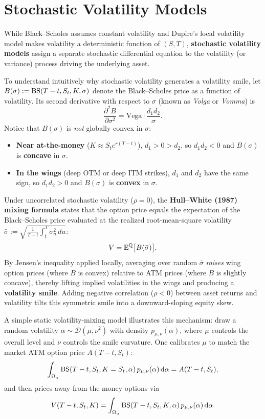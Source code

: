\section{Stochastic Volatility Models}
\label{sec:ch05-stoch-vol}

While Black--Scholes assumes constant volatility and Dupire's local volatility model makes volatility a deterministic function of $(S, T)$, \textbf{stochastic volatility models} assign a separate stochastic differential equation to the volatility (or variance) process driving the underlying asset.

To understand intuitively why stochastic volatility generates a volatility smile, let $B(\sigma) := \operatorname{BS}(T - t, S_t, K, \sigma)$ denote the Black--Scholes price as a function of volatility. Its second derivative with respect to $\sigma$ (known as \emph{Volga} or \emph{Vomma}) is
\[
    \frac{\partial^2 B}{\partial \sigma^2} = \text{Vega}\cdot\frac{d_1 d_2}{\sigma}.
\]
Notice that $B(\sigma)$ is \emph{not} globally convex in $\sigma$:
\begin{itemize}
    \item \textbf{Near at-the-money} ($K \approx S_t e^{r(T-t)}$), $d_1 > 0 > d_2$, so $d_1 d_2 < 0$ and $B(\sigma)$ is \textbf{concave} in $\sigma$.
    \item \textbf{In the wings} (deep OTM or deep ITM strikes), $d_1$ and $d_2$ have the same sign, so $d_1 d_2 > 0$ and $B(\sigma)$ is \textbf{convex} in $\sigma$.
\end{itemize}
Under uncorrelated stochastic volatility ($\rho = 0$), the \textbf{Hull--White (1987) mixing formula} states that the option price equals the expectation of the Black--Scholes price evaluated at the realized root-mean-square volatility $\bar{\sigma} := \sqrt{\frac{1}{T-t}\int_t^T \sigma_u^2\,du}$:
\[
    V = \mathbb{E}^{\mathbb{Q}}\bigl[B(\bar{\sigma})\bigr].
\]
By Jensen's inequality applied locally, averaging over random $\bar{\sigma}$ \emph{raises} wing option prices (where $B$ is convex) relative to ATM prices (where $B$ is slightly concave), thereby lifting implied volatilities in the wings and producing a \textbf{volatility smile}. Adding negative correlation ($\rho < 0$) between asset returns and volatility tilts this symmetric smile into a downward-sloping equity skew.

A simple static volatility-mixing model illustrates this mechanism: draw a random volatility $\alpha \sim \mathcal{D}(\mu, \nu^2)$ with density $p_{\mu,\nu}(\alpha)$, where $\mu$ controls the overall level and $\nu$ controls the smile curvature. One calibrates $\mu$ to match the market ATM option price $A(T - t, S_t)$:
\[
    \int_{\Omega_{\alpha}} \operatorname{BS}(T - t, S_t, K = S_t, \alpha)\,p_{\mu,\nu}(\alpha)\,\mathrm{d}\alpha = A(T - t, S_t),
\]
and then prices away-from-the-money options via
\[
    V(T - t, S_t, K) = \int_{\Omega_{\alpha}} \operatorname{BS}(T - t, S_t, K, \alpha)\,p_{\mu,\nu}(\alpha)\,\mathrm{d}\alpha.
\]

